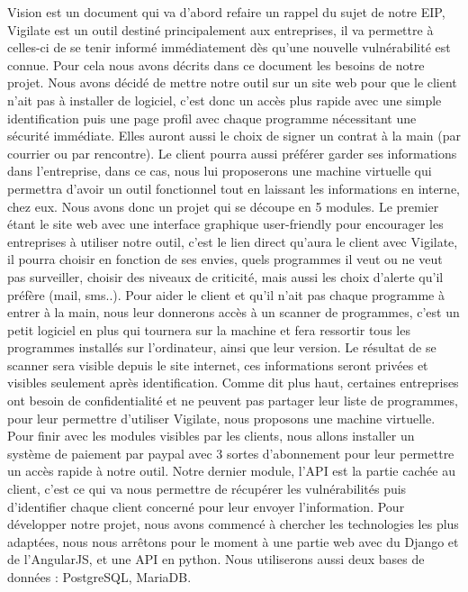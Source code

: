 Vision est un document qui va d'abord refaire un rappel du sujet de notre EIP, Vigilate est un outil destiné principalement aux entreprises, il va permettre à celles-ci de se tenir informé immédiatement dès qu'une nouvelle vulnérabilité est connue. Pour cela nous avons décrits dans ce document les besoins de notre projet. Nous avons décidé de mettre notre outil sur un site web pour que le client n'ait pas à installer de logiciel, c'est donc un accès plus rapide avec une simple identification puis une page profil avec chaque programme nécessitant une sécurité immédiate. Elles auront aussi le choix de signer un contrat à la main (par courrier ou par rencontre). Le client pourra aussi préférer garder ses informations dans l'entreprise, dans ce cas, nous lui proposerons une machine virtuelle qui permettra d'avoir un outil fonctionnel tout en laissant les informations en interne, chez eux. Nous avons donc un projet qui se découpe en 5 modules. Le premier étant le site web avec une interface graphique user-friendly pour encourager les entreprises à utiliser notre outil, c'est le lien direct qu'aura le client avec Vigilate, il pourra choisir en fonction de ses envies, quels programmes il veut ou ne veut pas surveiller, choisir des niveaux de criticité, mais aussi les choix d'alerte qu'il préfère (mail, sms..). Pour aider le client et qu'il n'ait pas chaque programme à entrer à la main, nous leur donnerons accès à un scanner de programmes, c'est un petit logiciel en plus qui tournera sur la machine et fera ressortir tous les programmes installés sur l'ordinateur, ainsi que leur version. Le résultat de se scanner sera visible depuis le site internet, ces informations seront privées et visibles seulement après identification. Comme dit plus haut, certaines entreprises ont besoin de confidentialité et ne peuvent pas partager leur liste de programmes, pour leur permettre d'utiliser Vigilate, nous proposons une machine virtuelle. Pour finir avec les modules visibles par les clients, nous allons installer un système de paiement par paypal avec 3 sortes d'abonnement pour leur permettre un accès rapide à notre outil. Notre dernier module, l'API est la partie cachée au client, c'est ce qui va nous permettre de récupérer les vulnérabilités puis d'identifier chaque client concerné pour leur envoyer l'information. Pour développer notre projet, nous avons commencé à chercher les technologies les plus adaptées, nous nous arrêtons pour le moment à une partie web avec du Django et de l'AngularJS, et une API en python. Nous utiliserons aussi deux bases de données : PostgreSQL, MariaDB.